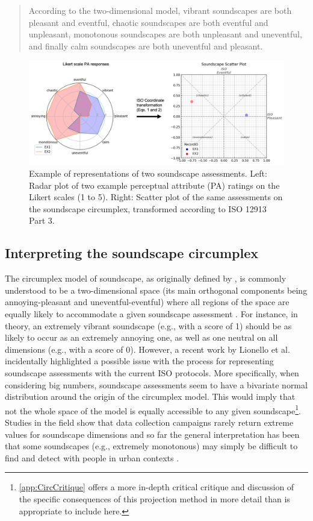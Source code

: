 \begin{quote}
  According to the two-dimensional model, vibrant soundscapes are both pleasant and eventful, chaotic soundscapes are both eventful and unpleasant, monotonous soundscapes are both unpleasant and uneventful, and finally calm soundscapes are both uneventful and pleasant.
\end{quote}

\begin{figure}
  \includegraphics[width=\textwidth]{Figures/jasa-el_Figure1.png}
  \caption{Example of representations of two soundscape assessments. Left: Radar plot of two example perceptual attribute (PA) ratings on the Likert scales (1 to 5). Right: Scatter plot of the same assessments on the soundscape circumplex, transformed according to ISO 12913 Part 3.
    \label{fig:radar}
  }
\end{figure}

\subsection{Interpreting the soundscape circumplex}
The circumplex model of soundscape, as originally defined by \citet{Axelsson2010principal}, is commonly understood to be a two-dimensional space (its main orthogonal components being annoying-pleasant and uneventful-eventful) where all regions of the space are equally likely to accommodate a given soundscape assessment \citep{Aletta2016Soundscape}. For instance, in theory, an extremely vibrant soundscape (e.g., with a score of 1) should be as likely to occur as an extremely annoying one, as well as one neutral on all dimensions (e.g., with a score of 0). However, a recent work by Lionello et al. \citep{Lionello2021Introducing} incidentally highlighted a possible issue with the process for representing soundscape assessments with the current ISO protocols. More specifically, when considering big numbers, soundscape assessments seem to have a bivariate normal distribution around the origin of the circumplex model. This would imply that not the whole space of the model is equally accessible to any given soundscape\footnote{\cref{app:CircCritique} offers a more in-depth critical critique and discussion of the specific consequences of this projection method in more detail than is appropriate to include here.}. Studies in the field show that data collection campaigns rarely return extreme values for soundscape dimensions \citep{Mancini2021Soundwalk} and so far the general interpretation has been that some soundscapes (e.g., extremely monotonous) may simply be difficult to find and detect with people in urban contexts \citep{Sun2019Classification}.

